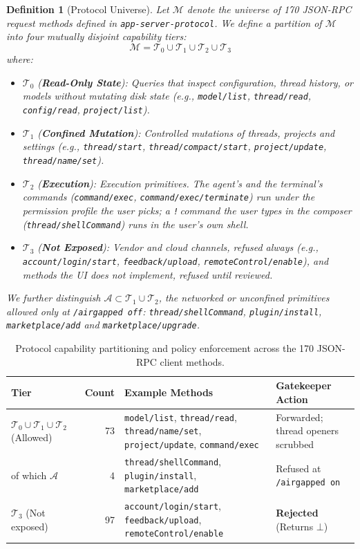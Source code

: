 \documentclass[11pt]{article}
\newtheorem{definition}{Definition}
\newcommand{\code}[1]{\texttt{#1}}
\newcommand{\agon}{\code{/airgapped on}}
\newcommand{\agoff}{\code{/airgapped off}}
\begin{document}
\begin{definition}[Protocol Universe]
Let $\mathcal{M}$ denote the universe of 170 JSON-RPC request methods defined in \code{app-server-protocol}. We define a
partition of $\mathcal{M}$ into four mutually disjoint capability tiers:
\begin{equation}
\mathcal{M} = \mathcal{T}_0 \cup \mathcal{T}_1 \cup \mathcal{T}_2 \cup \mathcal{T}_3
\end{equation}
where:
\begin{itemize}
    \item $\mathcal{T}_0$ (\textbf{Read-Only State}): Queries that inspect configuration, thread history, or models without
    mutating disk state (e.g., \code{model/list}, \code{thread/read}, \code{config/read}, \code{project/list}).
    \item $\mathcal{T}_1$ (\textbf{Confined Mutation}): Controlled mutations of threads, projects and settings
    (e.g., \code{thread/start}, \code{thread/compact/start}, \code{project/update}, \code{thread/name/set}).
    \item $\mathcal{T}_2$ (\textbf{Execution}): Execution primitives. The agent's and the terminal's commands
    (\code{command/exec}, \code{command/exec/terminate}) run under the permission profile the user picks; a
    \code{!}\,command the user types in the composer (\code{thread/shellCommand}) runs in the user's own shell.
    \item $\mathcal{T}_3$ (\textbf{Not Exposed}): Vendor and cloud channels, refused always (e.g., \code{account/login/start},
    \code{feedback/upload}, \code{remoteControl/enable}), and methods the UI does not implement, refused until reviewed.
\end{itemize}
We further distinguish $\mathcal{A} \subset \mathcal{T}_1 \cup \mathcal{T}_2$, the networked or unconfined primitives
allowed only at \agoff{}: \code{thread/shellCommand}, \code{plugin/install}, \code{marketplace/add} and
\code{marketplace/upgrade}.
\end{definition}

\begin{table}[t]
\centering
\small
\caption{Protocol capability partitioning and policy enforcement across the 170 JSON-RPC client methods.}
\label{tab:protocol-partition}
\begin{tabularx}{\linewidth}{lrXl}
\toprule
\textbf{Tier} & \textbf{Count} & \textbf{Example Methods} & \textbf{Gatekeeper Action} \\
\midrule
$\mathcal{T}_0 \cup \mathcal{T}_1 \cup \mathcal{T}_2$ (Allowed) & 73 & \code{model/list}, \code{thread/read}, \code{thread/name/set}, \code{project/update}, \code{command/exec} & Forwarded; thread openers scrubbed \\
\quad of which $\mathcal{A}$ & 4 & \code{thread/shellCommand}, \code{plugin/install}, \code{marketplace/add} & Refused at \agon \\
$\mathcal{T}_3$ (Not exposed) & 97 & \code{account/login/start}, \code{feedback/upload}, \code{remoteControl/enable} & \textbf{Rejected} (Returns $\bot$) \\
\bottomrule
\end{tabularx}
\end{table}
\end{document}
